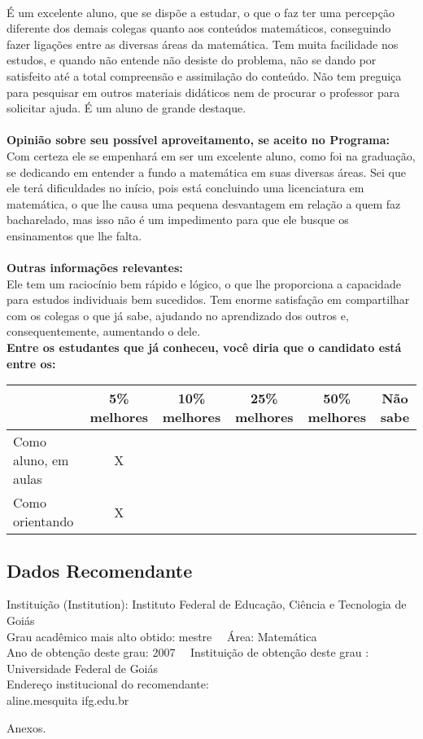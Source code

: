 \documentclass[11pt]{article}
\begin{document}
\\É um excelente aluno, que se dispõe a estudar, o que o faz ter uma percepção diferente dos demais colegas quanto aos conteúdos matemáticos, conseguindo fazer ligações entre as diversas áreas da matemática. Tem muita facilidade nos estudos, e quando não entende não desiste do problema, não se dando por satisfeito até a total compreensão e assimilação do conteúdo. Não tem preguiça para pesquisar em outros materiais didáticos nem de procurar o professor para solicitar ajuda. É um aluno de grande destaque.\\
\\
\textbf{Opinião sobre seu possível aproveitamento, se aceito no Programa:}
\\Com certeza ele se empenhará em ser um excelente aluno, como foi na graduação, se dedicando em entender a fundo a matemática em suas diversas áreas. Sei que ele terá dificuldades no início, pois está concluindo uma licenciatura em matemática, o que lhe causa uma pequena desvantagem em relação a quem faz bacharelado, mas isso não é um impedimento para que ele busque os ensinamentos que lhe falta.\\ 
\\
\textbf{Outras informações relevantes:} \\Ele tem um raciocínio bem rápido e lógico, o que lhe proporciona a capacidade para estudos individuais bem sucedidos. Tem enorme satisfação em compartilhar com os colegas o que já sabe, ajudando no aprendizado dos outros e, consequentemente, aumentando o dele.
\\[0.3cm]
\textbf{Entre os estudantes que já conheceu, você diria que o candidato está entre os:}
\\
\begin{tabular}{|l|c|c|c|c|c|}
\hline
 & 5\% melhores & 10\% melhores & 25\% melhores & 50\% melhores & Não sabe \\
\hline
Como aluno, em aulas & X &  &  &  & \\
\hline
Como orientando & X &  &  &  & \\
\hline
\end{tabular}
\subsection*{Dados Recomendante} 
	Instituição (Institution): Instituto Federal de Educação, Ciência e Tecnologia de Goiás
\\ 
	Grau acadêmico mais alto obtido: mestre
	\ \ Área: Matemática
	\\
	Ano de obtenção deste grau: 2007
	\ \ 
	Instituição de obtenção deste grau : Universidade Federal de Goiás
	\\ 
	Endereço institucional do recomendante: \\ aline.mesquita ifg.edu.br  
\begin{center}
Anexos.
\end{center}
\end{document}
